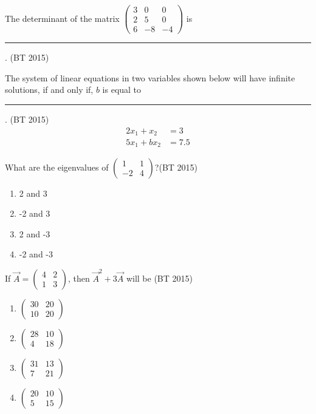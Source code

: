     \item The determinant of the matrix 
    $
    \begin{pmatrix}
    3 & 0 & 0 \\
    2 & 5 & 0 \\
    6 & -8 & -4
    \end{pmatrix}
    $
    is \rule{1cm}{0.01pt}.
    \hfill (BT 2015)
    \item The system of linear equations in two variables shown below will have infinite solutions, if and only if, $b$ is equal to 
\rule{1cm}{0.01pt}.
         \hfill (BT 2015)
\begin{align*}
        2x_{1} + x_{2} &= 3
	\\
        5x_{1} + bx_{2} &= 7.5
\end{align*}
\item What are the eigenvalues of 
$
\begin{pmatrix}
1 & 1 \\
-2 & 4
\end{pmatrix}
$?\hfill (BT 2015)
\begin{multicols}{4}
\begin{enumerate}
    \item 2 and 3
    \item -2 and 3
    \item 2 and -3
    \item -2 and -3
\end{enumerate}
\end{multicols}
\item If $\vec{A} = \begin{pmatrix} 4 & 2 \\ 1 & 3 \end{pmatrix}$, then $\vec{A}^{2} + 3\vec{A}$ will be  
\hfill (BT 2015)
\begin{multicols}{4}
\begin{enumerate}
    \item $\begin{pmatrix} 30 & 20 \\ 10 & 20 \end{pmatrix}$  
    \item $\begin{pmatrix} 28 & 10 \\ 4 & 18 \end{pmatrix}$  
    \item $\begin{pmatrix} 31 & 13 \\ 7 & 21 \end{pmatrix}$  
    \item $\begin{pmatrix} 20 & 10 \\ 5 & 15 \end{pmatrix}$  
\end{enumerate}
\end{multicols}


